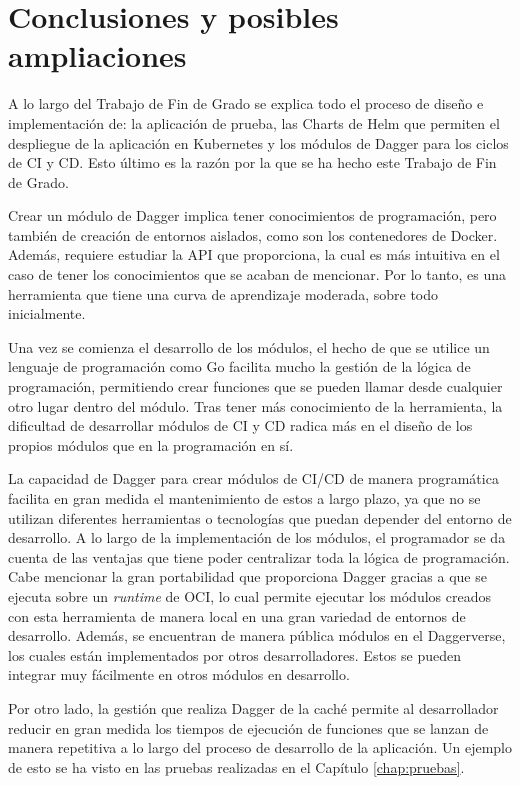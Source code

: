 \chapter{Conclusiones y posibles ampliaciones}


A lo largo del Trabajo de Fin de Grado se explica todo el proceso de diseño e implementación de: la aplicación de prueba, las Charts de Helm que permiten el despliegue de la aplicación en Kubernetes y los módulos de Dagger para los ciclos de CI y CD. Esto último es la razón por la que se ha hecho este Trabajo de Fin de Grado.

Crear un módulo de Dagger implica tener conocimientos de programación, pero también de creación de entornos aislados, como son los contenedores de Docker. Además, requiere estudiar la API que proporciona, la cual es más intuitiva en el caso de tener los conocimientos que se acaban de mencionar. Por lo tanto, es una herramienta que tiene una curva de aprendizaje moderada, sobre todo inicialmente.

Una vez se comienza el desarrollo de los módulos, el hecho de que se utilice un lenguaje de programación como Go facilita mucho la gestión de la lógica de programación, permitiendo crear funciones que se pueden llamar desde cualquier otro lugar dentro del módulo. Tras tener más conocimiento de la herramienta, la dificultad de desarrollar módulos de CI y CD radica más en el diseño de los propios módulos que en la programación en sí.

La capacidad de Dagger para crear módulos de CI/CD de manera programática facilita en gran medida el mantenimiento de estos a largo plazo, ya que no se utilizan diferentes herramientas o tecnologías que puedan depender del entorno de desarrollo. A lo largo de la implementación de los módulos, el programador se da cuenta de las ventajas que tiene poder centralizar toda la lógica de programación. Cabe mencionar la gran portabilidad que proporciona Dagger gracias a que se ejecuta sobre un \textit{runtime} de OCI, lo cual permite ejecutar los módulos creados con esta herramienta de manera local en una gran variedad de entornos de desarrollo. Además, se encuentran de manera pública módulos en el Daggerverse, los cuales están implementados por otros desarrolladores. Estos se pueden integrar muy fácilmente en otros módulos en desarrollo.

Por otro lado, la gestión que realiza Dagger de la caché permite al desarrollador reducir en gran medida los tiempos de ejecución de funciones que se lanzan de manera repetitiva a lo largo del proceso de desarrollo de la aplicación. Un ejemplo de esto se ha visto en las pruebas realizadas en el Capítulo \ref{chap:pruebas}.

